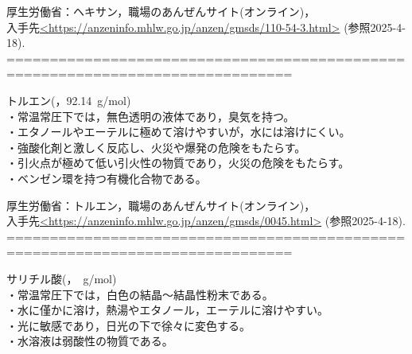   厚生労働省：ヘキサン，職場のあんぜんサイト(オンライン)，\\
             入手先\url{<https://anzeninfo.mhlw.go.jp/anzen/gmsds/110-54-3.html>}
             (参照2025-4-18).
===============================================================================
\item トルエン(，92.14\ g/mol)\cite{d}\\
    \hspace{0pt}・常温常圧下では，無色透明の液体であり，臭気を持つ。\\
    \hspace{0pt}・エタノールやエーテルに極めて溶けやすいが，水には溶けにくい。\\
    \hspace{0pt}・強酸化剤と激しく反応し、火災や爆発の危険をもたらす。\\
    \hspace{0pt}・引火点が極めて低い引火性の物質であり，火災の危険をもたらす。\\
    \hspace{0pt}・ベンゼン環を持つ有機化合物である。\\

\begin{minipage}[b]{0.30\textwidth}
    \centering
    \caption{トルエン}
    \label{fig:C7H8}
\end{minipage}

  厚生労働省：トルエン，職場のあんぜんサイト(オンライン)，\\
             入手先\url{<https://anzeninfo.mhlw.go.jp/anzen/gmsds/0045.html>}
             (参照2025-4-18).
===============================================================================
\item サリチル酸(，\ g/mol)\cite{d}\\
    \hspace{0pt}・常温常圧下では，白色の結晶〜結晶性粉末である。\\
    \hspace{0pt}・水に僅かに溶け，熱湯やエタノール，エーテルに溶けやすい。\\
    \hspace{0pt}・光に敏感であり，日光の下で徐々に変色する。\\
    \hspace{0pt}・水溶液は弱酸性の物質である。\\

\begin{minipage}[b]{0.40\textwidth}
    \centering
    \caption{サリチル酸}
    \label{fig:C7H6O3}
\end{minipage}

